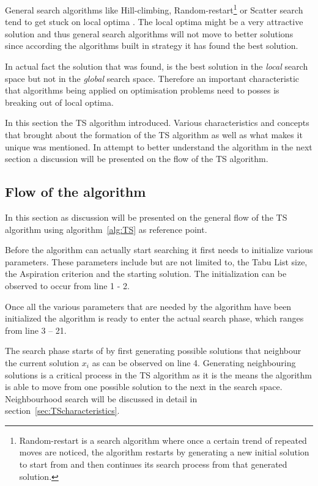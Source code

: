 General search algorithms like Hill-climbing, Random-restart\footnote{Random-restart is a search algorithm where once a certain trend of repeated moves are noticed, the algorithm restarts by generating a new initial solution to start from and then continues its search process from that generated solution\cite{AIModernApproach}.} or Scatter search tend to get stuck on local optima \cite{AIModernApproach}. The local optima might be a very attractive solution and thus general search algorithms will not move to better solutions since according the algorithms built in strategy it has found the best solution. 

In actual fact the solution that was found, is the best solution in the \emph{local} search space but not in the \emph{global} search space\cite{CompuIntelligenceIntro,AIModernApproach}. Therefore an important characteristic that algorithms being applied on optimisation problems need to posses is breaking out of local optima\cite{CompuIntelligenceIntro,AIModernApproach}.

In this section the TS algorithm introduced. Various characteristics and concepts that brought about the formation of the TS algorithm as well as what makes it unique was mentioned. In attempt to better understand the algorithm in the next section a discussion will be presented on the flow of the TS algorithm.
\subsection{Flow of the algorithm}
In this section as discussion will be presented on the general flow of the TS algorithm using algorithm~\ref{alg:TS} as reference point.

Before the algorithm can actually start searching it first needs to initialize various parameters. These parameters include but are not limited to, the Tabu List size, the Aspiration criterion and the starting solution. The initialization can be observed to occur from line 1 - 2.

Once all the various parameters that are needed by the algorithm have been initialized the algorithm is ready to enter the actual search phase, which ranges from line 3 -- 21. 

The search phase starts of by first generating possible solutions that neighbour the current solution $x_i$ as can be observed on line 4. Generating neighbouring solutions is a critical process in the TS algorithm as it is the means the algorithm is able to move from one possible solution to the next in the search space. Neighbourhood search will be discussed in detail in section~\ref{sec:TScharacteristics}.


